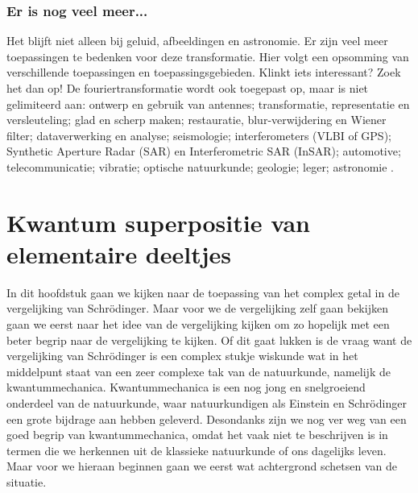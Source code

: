 \documentclass[11pt,fleqn]{book} %
\begin{document}
\subsection{Er is nog veel meer...}
Het blijft niet alleen bij geluid, afbeeldingen en astronomie. Er zijn veel meer toepassingen te bedenken voor deze transformatie. Hier volgt een opsomming van verschillende toepassingen en toepassingsgebieden. Klinkt iets interessant? Zoek het dan op!
De fouriertransformatie wordt ook toegepast op, maar is niet gelimiteerd aan: ontwerp en gebruik van antennes; transformatie, representatie en versleuteling; glad en scherp maken; restauratie, blur-verwijdering en Wiener filter; dataverwerking en analyse; seismologie; interferometers (VLBI of GPS); Synthetic Aperture Radar (SAR) en Interferometric SAR (InSAR); automotive; telecommunicatie; vibratie; optische natuurkunde; geologie; leger; astronomie \cite{in}\cite{gp}.


\chapter{Kwantum superpositie van elementaire deeltjes}
In dit hoofdstuk gaan we kijken naar de toepassing van het complex getal in de vergelijking van Schrödinger. Maar voor we de vergelijking zelf gaan bekijken gaan we eerst naar het idee van de vergelijking kijken om zo hopelijk met een beter begrip naar de vergelijking te kijken. Of dit gaat lukken is de vraag want de vergelijking van Schrödinger is een complex stukje wiskunde wat in het middelpunt staat van een zeer complexe tak van de natuurkunde, namelijk de kwantummechanica. Kwantummechanica is een nog jong en snelgroeiend onderdeel van de natuurkunde, waar natuurkundigen als Einstein en Schrödinger een grote bijdrage aan hebben geleverd. Desondanks zijn we nog ver weg van een goed begrip van kwantummechanica, omdat het vaak niet te beschrijven is in termen die we herkennen uit de klassieke natuurkunde of ons dagelijks leven. Maar voor we hieraan beginnen gaan we eerst wat achtergrond schetsen van de situatie.
\end{document}
